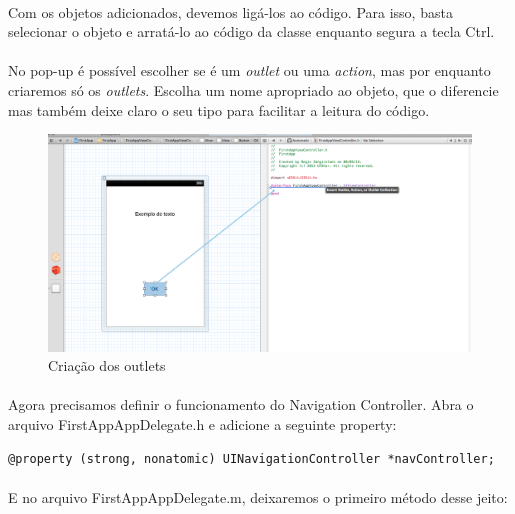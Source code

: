 \documentclass[a4paper,12pt,brazil,doubleside]{book}
\begin{document}
\bigskip

\paragraph{}Com os objetos adicionados, devemos ligá-los ao código. Para isso, basta selecionar o objeto e arratá-lo ao código da classe enquanto segura a tecla Ctrl.
\paragraph{}No pop-up é possível escolher se é um \emph{outlet} ou uma \emph{action}, mas por enquanto criaremos só os \emph{outlets}. Escolha um nome apropriado ao objeto, que o diferencie mas também deixe claro o seu tipo para facilitar a leitura do código.

\begin{figure}[h]
  \centering
  \includegraphics[totalheight=0.3\textheight]{../figuras/ios/1/link_outlet_button.png}
  \caption{Criação dos outlets}
  \label{fig:a}
\end{figure}

\bigskip

\paragraph{}Agora precisamos definir o funcionamento do Navigation Controller. Abra o arquivo FirstAppAppDelegate.h e adicione a seguinte property:\\

\begin{lstlisting}
@property (strong, nonatomic) UINavigationController *navController;
\end{lstlisting}

\paragraph{}E no arquivo FirstAppAppDelegate.m, deixaremos o primeiro método desse jeito:\\
\end{document}
